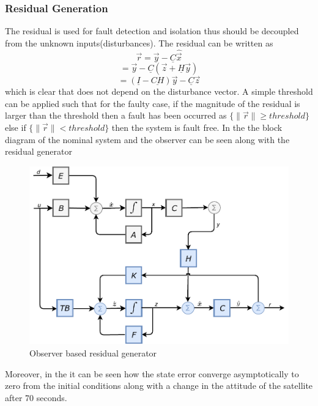 \subsubsection{Residual Generation}
The residual is used for fault detection and isolation thus should be decoupled from the unknown inputs(disturbances). The residual can be written as
\begin{equation*}
\vec{r} = \vec{y} - \underline C \hat{\vec{x}} 
\label{errordynamics11}
\end{equation*}
\begin{equation*}
= \vec{y} - \underline C (\vec{z} + \underline{H} \vec{y} ) 
\label{errordynamics12}
\end{equation*}
\begin{equation*}
= (\underline I  -\underline{ CH})\vec{y}   -\underline C \vec{z} 
\label{errordynamics13}
\end{equation*}
which is clear that does not depend on the disturbance vector. A simple threshold can be applied such that for the faulty case, if the magnitude of the residual is larger than the threshold then a fault has been occurred as
$\{\lVert \vec{r}\rVert \geq threshold \}$ else if $\{\lVert \vec{r}\rVert < threshold \}$ then the system is fault free. In the  the block diagram of the nominal system and the observer can be seen along with the residual generator
\begin{figure}[H]
	\centering
	\includegraphics[width=0.7\linewidth]{figures/UIO}
	\caption{Observer based residual generator}
	\label{fig:residualobs}
\end{figure}
Moreover, in the  it can be seen how the state error converge asymptotically to zero from the initial conditions along with a change in the attitude of the satellite after 70 seconds.

